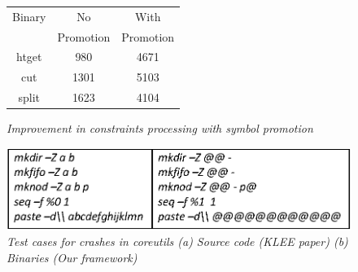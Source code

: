 \begin{figure}[t]
{
\begin{minipage}[t]{.4\linewidth}
\centering
{
\begin{scriptsize}
\begin{tabular}{|c|c|c|} %
\hline
{Binary}&{No}&{With}\\ 
{}&{Promotion}&{Promotion}\\ \hline
htget&980&4671\\ \hline
cut&1301&5103\\ \hline
split&1623&4104\\ \hline
\end{tabular}
\caption {\scriptsize{\textit{Improvement in constraints processing with symbol promotion }}}
\label{fig:results-symExecSymMem}
\end{scriptsize}%
}
\end{minipage}
\hfill
\begin{minipage}[t]{.5\linewidth}
\centering
{
\includegraphics[width=\linewidth]{figures/EPS/resultssymExecution-testCase.eps}
\caption{\scriptsize{\textit{Test cases for crashes in coreutils (a) Source code (KLEE paper) (b) Binaries (Our framework)}}}
\label{fig:result-symExec-testCases}
}
\end{minipage}
}
\vspace{-4ex}
\end{figure}
